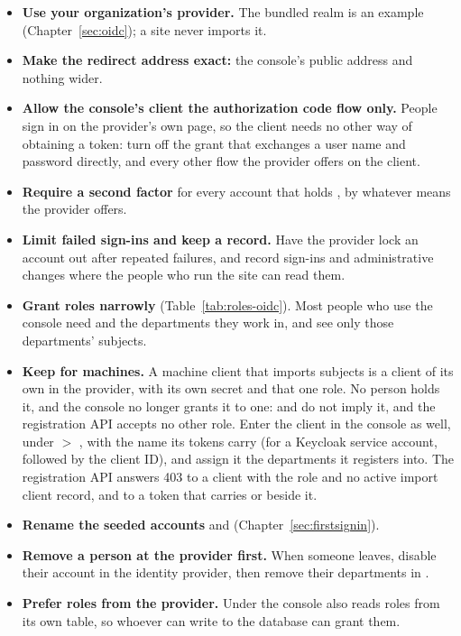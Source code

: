 \documentclass[11pt, a4paper]{article}
\begin{document}
\begin{itemize}
  \item \textbf{Use your organization's provider.} The bundled realm is an example
        (Chapter~\ref{sec:oidc}); a site never imports it.
  \item \textbf{Make the redirect address exact:} the console's public  address and
        nothing wider.
  \item \textbf{Allow the console's client the authorization code flow only.} People sign in
        on the provider's own page, so the client needs no other way of obtaining a token: turn
        off the grant that exchanges a user name and password directly, and every other flow
        the provider offers on the client.
  \item \textbf{Require a second factor} for every account that holds , by
        whatever means the provider offers.
  \item \textbf{Limit failed sign-ins and keep a record.} Have the provider lock an account
        out after repeated failures, and record sign-ins and administrative changes where the
        people who run the site can read them.
  \item \textbf{Grant roles narrowly} (Table~\ref{tab:roles-oidc}). Most people who use the
        console need  and the departments they work in, and see only those
        departments' subjects.
  \item \textbf{Keep  for machines.} A machine client that imports
        subjects is a client of its own in the provider, with its own secret and that one
        role. No person holds it, and the console no longer grants it to one: 
        and  do not imply it, and the registration API accepts no other role.
        Enter the client in the console as well, under  $>$ ,
        with the name its tokens carry (for a Keycloak service account,
         followed by the client ID), and assign it the departments it
        registers into. The registration API answers 403 to a client with the role and no
        active import client record, and to a token that carries  or
         beside it.
  \item \textbf{Rename the seeded accounts}  and 
        (Chapter~\ref{sec:firstsignin}).
  \item \textbf{Remove a person at the provider first.} When someone leaves, disable their
        account in the identity provider, then remove their departments in .
  \item \textbf{Prefer roles from the provider.} Under
         the console also reads roles from its own
        table, so whoever can write to the database can grant them.
\end{itemize}
\end{document}
